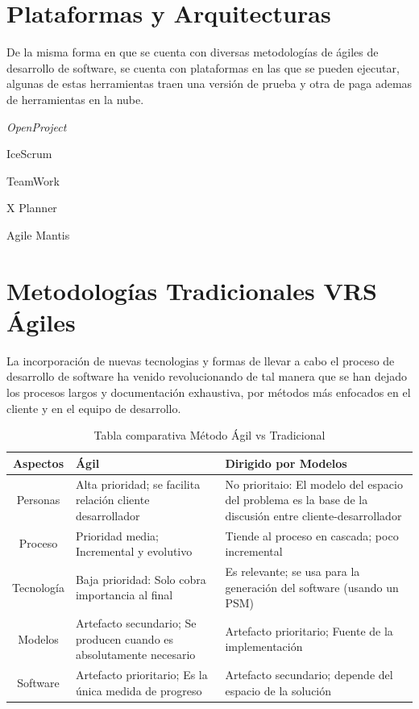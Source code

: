 \documentclass[10pt,a4paper]{article}
\begin{document}
\section{Plataformas y Arquitecturas}
De la misma forma en que se cuenta con diversas metodolog\'ias de \'agiles de desarrollo de software, se cuenta con plataformas en las que se pueden ejecutar, algunas de estas herramientas traen una versi\'on de prueba y otra de paga ademas de herramientas en la nube.

\begin{list}{}{}
	\item \textit{OpenProject}
	\item IceScrum
	\item TeamWork
	\item X Planner
	\item Agile Mantis
\end{list}

\section{Metodolog\'ias Tradicionales VRS \'Agiles}
La incorporaci\'on de nuevas tecnologias y formas de llevar a cabo el proceso de desarrollo de software ha venido revolucionando de tal manera que se han dejado los procesos largos y documentaci\'on exhaustiva, por m\'etodos m\'as enfocados en el cliente y en el equipo de desarrollo.

\begin{table}[h]
	\begin{center}
		\begin{tabular}{ | c | m{5cm} | m{5cm} | }
			\hline Aspectos & \'Agil & Dirigido por Modelos \\
			\hline Personas & Alta prioridad; se facilita relaci\'on cliente desarrollador & No prioritaio: El modelo del espacio del problema es la base de la discusi\'on entre cliente-desarrollador \\
			\hline Proceso & Prioridad media; Incremental y evolutivo & Tiende al proceso en cascada; poco incremental \\
			\hline Tecnolog\'ia & Baja prioridad: Solo cobra importancia al final & Es relevante; se usa para la generaci\'on del software (usando un PSM)\\
			\hline Modelos & Artefacto secundario; Se producen cuando es absolutamente necesario & Artefacto prioritario; Fuente de la implementaci\'on\\
			\hline Software & Artefacto prioritario; Es la \'unica medida de progreso & Artefacto secundario; depende del espacio de la soluci\'on \\ \hline
		\end{tabular}	
		\caption{Tabla comparativa M\'etodo \'Agil vs Tradicional}		
	\end{center}
\end{table}
\end{document}
